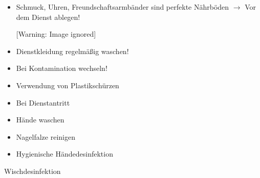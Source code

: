 \documentclass{article}
\begin{document}
\begin{itemize}
\item {\mdseries
Schmuck, Uhren, Freundschaftsarmb\"ander sind perfekte N\"ahrb\"oden
${\rightarrow}$ Vor dem Dienst ablegen!}

\begin{center}
 [Warning: Image ignored] %

\end{center}
\item {\mdseries
Dienstkleidung regelm\"a{\ss}ig waschen!}

\item {\mdseries
Bei Kontamination wechseln!}

\item {\mdseries
Verwendung von Plastiksch\"urzen}

\item {\mdseries
Bei Dienstantritt}

\end{itemize}
\begin{itemize}
\item {\mdseries
H\"ande waschen}

\item {\mdseries
Nagelfalze reinigen}

\item {\mdseries
{}Hygienische
H\"andedesinfektion}

\end{itemize}
{\mdseries\color[rgb]{0.0,0.0,0.5019608}
Wischdesinfektion}
\end{document}
